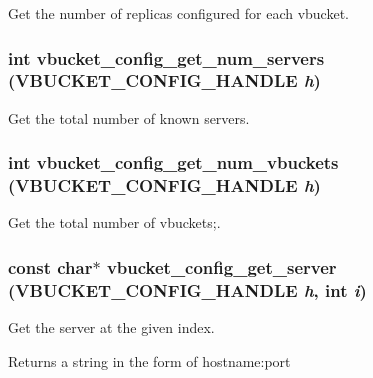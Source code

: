 Get the number of replicas configured for each vbucket. 

\hypertarget{group__cfg_ga3ee2eda1aab2a6c36794cc5ea9a89984}{
\subsubsection[{vbucket\_\-config\_\-get\_\-num\_\-servers}]{\setlength{\rightskip}{0pt plus 5cm}int vbucket\_\-config\_\-get\_\-num\_\-servers (VBUCKET\_\-CONFIG\_\-HANDLE {\em h})}}
\label{group__cfg_ga3ee2eda1aab2a6c36794cc5ea9a89984}


Get the total number of known servers. 

\hypertarget{group__cfg_ga83b3ce8468743627eec4a27677b04148}{
\subsubsection[{vbucket\_\-config\_\-get\_\-num\_\-vbuckets}]{\setlength{\rightskip}{0pt plus 5cm}int vbucket\_\-config\_\-get\_\-num\_\-vbuckets (VBUCKET\_\-CONFIG\_\-HANDLE {\em h})}}
\label{group__cfg_ga83b3ce8468743627eec4a27677b04148}


Get the total number of vbuckets;. 

\hypertarget{group__cfg_gac403d4b4b1dce07946c8b4c48e824199}{
\subsubsection[{vbucket\_\-config\_\-get\_\-server}]{\setlength{\rightskip}{0pt plus 5cm}const char$\ast$ vbucket\_\-config\_\-get\_\-server (VBUCKET\_\-CONFIG\_\-HANDLE {\em h}, \/  int {\em i})}}
\label{group__cfg_gac403d4b4b1dce07946c8b4c48e824199}


Get the server at the given index. 

\begin{DoxyReturn}{Returns}
a string in the form of hostname:port 
\end{DoxyReturn}
